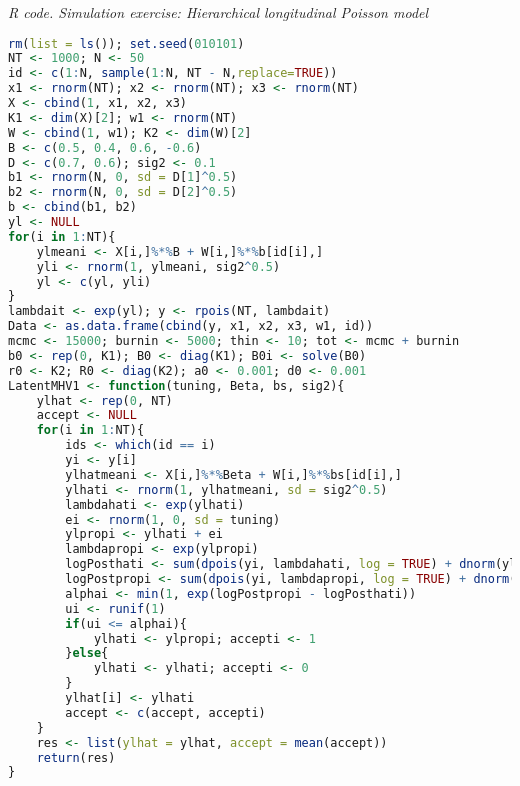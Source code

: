 \begin{tcolorbox}[enhanced,width=4.67in,center upper,
	fontupper=\large\bfseries,drop shadow southwest,sharp corners]
	\textit{R code. Simulation exercise: Hierarchical longitudinal Poisson model}
	\begin{VF}
		\begin{lstlisting}[language=R]
rm(list = ls()); set.seed(010101)
NT <- 1000; N <- 50
id <- c(1:N, sample(1:N, NT - N,replace=TRUE))
x1 <- rnorm(NT); x2 <- rnorm(NT); x3 <- rnorm(NT) 
X <- cbind(1, x1, x2, x3)
K1 <- dim(X)[2]; w1 <- rnorm(NT) 
W <- cbind(1, w1); K2 <- dim(W)[2]
B <- c(0.5, 0.4, 0.6, -0.6)
D <- c(0.7, 0.6); sig2 <- 0.1
b1 <- rnorm(N, 0, sd = D[1]^0.5)
b2 <- rnorm(N, 0, sd = D[2]^0.5)
b <- cbind(b1, b2)
yl <- NULL
for(i in 1:NT){
	ylmeani <- X[i,]%*%B + W[i,]%*%b[id[i],]
	yli <- rnorm(1, ylmeani, sig2^0.5)
	yl <- c(yl, yli)
}
lambdait <- exp(yl); y <- rpois(NT, lambdait)
Data <- as.data.frame(cbind(y, x1, x2, x3, w1, id))
mcmc <- 15000; burnin <- 5000; thin <- 10; tot <- mcmc + burnin
b0 <- rep(0, K1); B0 <- diag(K1); B0i <- solve(B0) 
r0 <- K2; R0 <- diag(K2); a0 <- 0.001; d0 <- 0.001
LatentMHV1 <- function(tuning, Beta, bs, sig2){
	ylhat <- rep(0, NT)
	accept <- NULL
	for(i in 1:NT){
		ids <- which(id == i)
		yi <- y[i]
		ylhatmeani <- X[i,]%*%Beta + W[i,]%*%bs[id[i],]
		ylhati <- rnorm(1, ylhatmeani, sd = sig2^0.5)
		lambdahati <- exp(ylhati)
		ei <- rnorm(1, 0, sd = tuning)
		ylpropi <- ylhati + ei
		lambdapropi <- exp(ylpropi)
		logPosthati <- sum(dpois(yi, lambdahati, log = TRUE) + dnorm(ylhati, ylhatmeani, sig2^0.5, log = TRUE))
		logPostpropi <- sum(dpois(yi, lambdapropi, log = TRUE) + dnorm(ylpropi, ylhatmeani, sig2^0.5, log = TRUE))
		alphai <- min(1, exp(logPostpropi - logPosthati))
		ui <- runif(1)
		if(ui <= alphai){
			ylhati <- ylpropi; accepti <- 1
		}else{
			ylhati <- ylhati; accepti <- 0
		}
		ylhat[i] <- ylhati
		accept <- c(accept, accepti)
	}
	res <- list(ylhat = ylhat, accept = mean(accept))
	return(res)
}
\end{lstlisting}
	\end{VF}
\end{tcolorbox}


